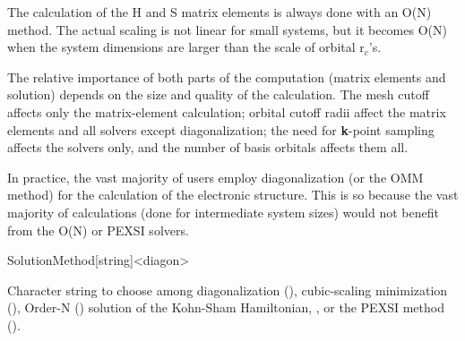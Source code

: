 The calculation of the H and S matrix elements is always done with an
O(N) method. The actual scaling is not linear for small systems, but
it becomes O(N) when the system dimensions are larger than the scale
of orbital r$_c$'s.

The relative importance of both parts of the computation (matrix
elements and solution) depends on the size and quality of the
calculation. The mesh cutoff affects only the matrix-element
calculation; orbital cutoff radii affect the matrix elements and all
solvers except diagonalization; the need for \textbf{k}-point sampling
affects the solvers only, and the number of basis orbitals affects
them all.

In practice, the vast majority of users employ diagonalization (or the
OMM method) for the calculation of the electronic structure. This is
so because the vast majority of calculations (done for intermediate
system sizes) would not benefit from the O(N) or PEXSI solvers.

\begin{fdfentry}{SolutionMethod}[string]<diagon>

  Character string to choose among diagonalization (),
  cubic-scaling minimization (), Order-N ()
  solution of the Kohn-Sham Hamiltonian, , or the
  PEXSI method ().
  
\end{fdfentry}


